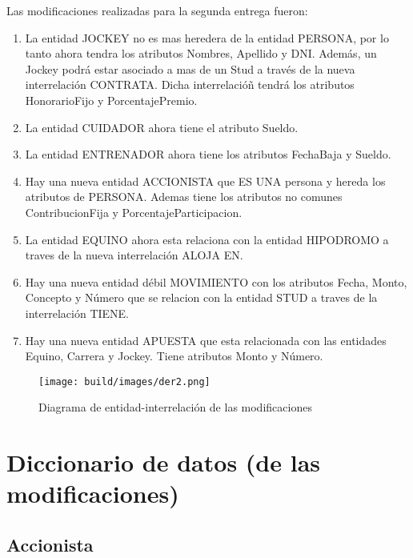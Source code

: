 \documentclass[a4paper,11pt]{article}
\begin{document}
Las modificaciones realizadas para la segunda entrega fueron:
\begin{enumerate}

  \item La entidad JOCKEY no es mas heredera de la entidad PERSONA, por lo tanto
	ahora tendra los atributos Nombres, Apellido y DNI. Además, un Jockey podrá
	estar asociado a mas de un Stud a través de la nueva interrelación CONTRATA.
  Dicha interrelacióñ tendrá los atributos HonorarioFijo y PorcentajePremio. 

  \item La entidad CUIDADOR ahora tiene el atributo Sueldo.

  \item La entidad ENTRENADOR ahora tiene los atributos FechaBaja y Sueldo. 

  \item Hay una nueva entidad ACCIONISTA que ES UNA persona y hereda los atributos
	de PERSONA. Ademas tiene los atributos no comunes ContribucionFija y 
  PorcentajeParticipacion.
  
  \item La entidad EQUINO ahora esta relaciona con la entidad HIPODROMO a traves
    de la nueva interrelación ALOJA EN. 

  \item Hay una nueva entidad débil MOVIMIENTO con los atributos Fecha, Monto,
    Concepto y Número que se relacion con la entidad STUD a traves de la interrelación
    TIENE.

  \item Hay una nueva entidad APUESTA que esta relacionada con las entidades Equino, 
    Carrera y Jockey. Tiene atributos Monto y Número. 

\end{enumerate}

\begin{figure}[h!t]
  \centering
  \texttt{[image: build/images/der2.png]}
  \caption{Diagrama de entidad-interrelación de las modificaciones} \label{fig:der2}
\end{figure}

\FloatBarrier

\section{Diccionario de datos (de las modificaciones)}

\subsection{Accionista}
\end{document}

